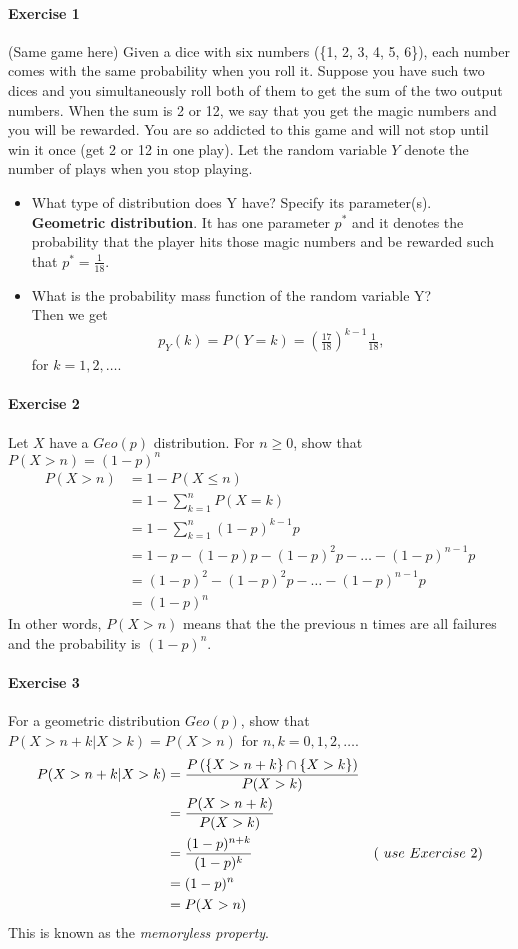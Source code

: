 \documentclass{article} %
\begin{document}
\paragraph*{Exercise 1} (Same game here) Given a dice with six numbers (\{1, 2, 3, 4, 5, 6\}), each number comes with the same probability when you roll it. Suppose you have such two dices and you simultaneously roll both of them to get the sum of the two output numbers. When the sum is 2 or 12, we say that you get the magic numbers and you will be rewarded. You are so addicted to this game and will not stop until win it once (get 2 or 12 in one play). Let the random variable $Y$ denote the number of plays when you stop playing. 
\begin{itemize}
\item What type of distribution does Y have? Specify its parameter(s).  \\
{\bf Geometric distribution}. It has one parameter $p^*$ and it denotes the probability that the player hits those magic numbers and be rewarded such that $p^* = \frac{1}{18}$.\\
\item What is the probability mass function of the random variable Y? \\
Then we get 
\begin{align*}
p_Y(k)=P(Y=k)=(\frac{17}{18})^{k-1}\frac{1}{18}, 
\end{align*}
for $k=1, 2, \ldots$. 
\end{itemize}

\paragraph*{Exercise 2} Let $X$ have a $Geo(p)$ distribution. For $n \geq 0$, show that $P(X > n) = (1-p)^n$
\begin{align*}
P( X > n) &  = 1 - P(X \leq n) \\
& = 1 - \sum_{k=1}^n P(X=k) \\
& = 1 - \sum_{k=1}^n (1-p)^{k-1}p \\
& = 1 - p - (1-p)p - (1-p)^2p - \ldots - (1-p)^{n-1}p \\
& = (1-p)^2 - (1-p)^2p - \ldots - (1-p)^{n-1}p \\
& = (1-p)^n 
\end{align*}
In other words, $P(X>n)$ means that the the previous n times are all failures and the probability is $(1-p)^n$. 

\paragraph*{Exercise 3} For a geometric distribution $Geo(p)$, show that $P(X> n + k | X > k) = P(X > n)$ for $n, k = 0, 1, 2, \ldots$. 
\begin{align*}
P(X> n + k | X > k) & = \frac{P \left( \{X > n + k\}\cap \{X > k\}\right) }{P(X > k)} & \\
& = \frac{P(X > n + k)}{P(X > k)} & \\
& = \frac{(1-p)^{n+k}}{(1-p)^k}& \text(\ use\  Exercise\ 2) \\
& = (1-p)^n & \\
& = P(X>n)
\end{align*}
This is known as the {\it memoryless property}. 
\end{document}

